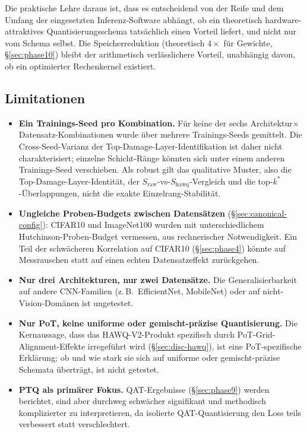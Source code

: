 Die praktische Lehre daraus ist, dass es entscheidend von der Reife und dem Umfang der eingesetzten Inferenz-Software abhängt, ob ein theoretisch hardware-attraktives Quantisierungsschema tatsächlich einen Vorteil liefert, und nicht nur vom Schema selbst. Die Speicherreduktion (theoretisch $4\times$ für Gewichte, \S\ref{sec:phase10}) bleibt der arithmetisch verlässlichere Vorteil, unabhängig davon, ob ein optimierter Rechenkernel existiert.

\subsection{Limitationen}
\label{sec:limitations}

\begin{itemize}
\item \textbf{Ein Trainings-Seed pro Kombination.} Für keine der sechs Architektur$\times$Datensatz-Kombinationen wurde über mehrere Trainings-Seeds gemittelt. Die Cross-Seed-Varianz der Top-Damage-Layer-Identifikation ist daher nicht charakterisiert; einzelne Schicht-Ränge könnten sich unter einem anderen Trainings-Seed verschieben. Als robust gilt das qualitative Muster, also die Top-Damage-Layer-Identität, der $S_{\mathrm{raw}}$-vs-$S_{\mathrm{hawq}}$-Vergleich und die top-$k^*$-Überlappungen, nicht die exakte Einzelrang-Stabilität.
\item \textbf{Ungleiche Proben-Budgets zwischen Datensätzen} (\S\ref{sec:canonical-config}): CIFAR10 und ImageNet100 wurden mit unterschiedlichem Hutchinson-Proben-Budget vermessen, aus rechnerischer Notwendigkeit. Ein Teil der schwächeren Korrelation auf CIFAR10 (\S\ref{sec:phase4}) könnte auf Messrauschen statt auf einen echten Datensatzeffekt zurückgehen.
\item \textbf{Nur drei Architekturen, nur zwei Datensätze.} Die Generalisierbarkeit auf andere CNN-Familien (z.\,B.\ EfficientNet, MobileNet) oder auf nicht-Vision-Domänen ist ungetestet.
\item \textbf{Nur PoT, keine uniforme oder gemischt-präzise Quantisierung.} Die Kernaussage, dass das HAWQ-V2-Produkt spezifisch durch PoT-Grid-Alignment-Effekte irregeführt wird (\S\ref{sec:disc-hawq}), ist eine PoT-spezifische Erklärung; ob und wie stark sie sich auf uniforme oder gemischt-präzise Schemata überträgt, ist nicht getestet.
\item \textbf{PTQ als primärer Fokus.} QAT-Ergebnisse (\S\ref{sec:phase9}) werden berichtet, sind aber durchweg schwächer signifikant und methodisch komplizierter zu interpretieren, da isolierte QAT-Quantisierung den Loss teils verbessert statt verschlechtert.

\end{itemize}
